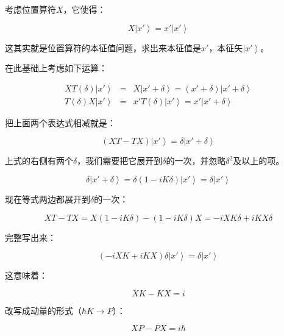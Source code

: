 考虑位置算符$X$，它使得：

\begin{equation}
X \left| x' \right\rangle = x' \left| x' \right\rangle 
\end{equation}

这其实就是位置算符的本征值问题，求出来本征值是$x'$，本征矢$\left| x' \right\rangle$。

在此基础上考虑如下运算：

\begin{eqnarray*}
X T(\delta) \left| x' \right\rangle &=& X \left| x' + \delta \right\rangle = \left( x' + \delta \right) \left| x' + \delta \right\rangle \\
T(\delta) X \left| x' \right\rangle &=& x' T(\delta) \left| x' \right\rangle = x' \left| x' + \delta \right\rangle  
\end{eqnarray*}

把上面两个表达式相减就是：

\begin{equation*}
\left( XT - TX \right) \left| x' \right\rangle = \delta \left| x' + \delta \right\rangle  
\end{equation*}

上式的右侧有两个$\delta$，我们需要把它展开到$\delta$的一次，并忽略$\delta^2$及以上的项。

\begin{equation*}
\delta \left| x' + \delta \right\rangle = \delta \left( 1- i K \delta \right) \left| x' \right\rangle = \delta \left| x' \right\rangle
\end{equation*}

现在等式两边都展开到$\delta$的一次：

\begin{equation*}
XT - TX = X \left( 1- i K \delta \right) - \left( 1- i K \delta \right) X = -i XK \delta + i KX \delta
\end{equation*}

完整写出来：

\begin{equation*}
\left( -i XK + i KX \right) \delta \left| x' \right\rangle = \delta \left| x' \right\rangle
\end{equation*}

这意味着：

\begin{equation}
XK - KX = i
\end{equation}

改写成动量的形式（$\hbar K \to P$）：

\begin{equation}
XP - PX = i \hbar
\end{equation}

